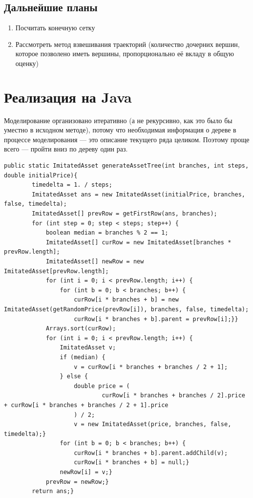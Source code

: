 \documentclass[specialist,
               substylefile = spbu.rtx,
               subf,href,colorlinks=true, 12pt]{disser}
\begin{document}
\section*{Дальнейшие планы}
	\begin{enumerate}
		\item Посчитать конечную сетку
		\item Рассмотреть метод взвешивания траекторий (количество дочерних вершин, которое позволено иметь вершины, пропорционально её вкладу в общую оценку)
	\end{enumerate}
\nocite{*}



\appendix
\chapter{Реализация на Java}
Моделирование организовано итеративно (а не рекурсивно, как это было бы уместно в исходном методе), потому что необходимая информация о дереве в процессе моделирования --- это описание текущего ряда целиком. Поэтому проще всего --- пройти вниз по дереву один раз.
\renewcommand{\lstlistingname}{Листинг}%
\renewcommand{\lstlistlistingname}{Листинги}
\begin{lstlisting}[caption={Генерирование дерева состояний актива, на который выписан опцион},label={lst:treeGeneration}]
public static ImitatedAsset generateAssetTree(int branches, int steps, double initialPrice){
        timedelta = 1. / steps;
        ImitatedAsset ans = new ImitatedAsset(initialPrice, branches, false, timedelta);
        ImitatedAsset[] prevRow = getFirstRow(ans, branches);
        for (int step = 0; step < steps; step++) {
            boolean median = branches % 2 == 1;
            ImitatedAsset[] curRow = new ImitatedAsset[branches * prevRow.length];
            ImitatedAsset[] newRow = new ImitatedAsset[prevRow.length];
            for (int i = 0; i < prevRow.length; i++) {
                for (int b = 0; b < branches; b++) {
                    curRow[i * branches + b] = new ImitatedAsset(getRandomPrice(prevRow[i]), branches, false, timedelta);
                    curRow[i * branches + b].parent = prevRow[i];}}
            Arrays.sort(curRow);
            for (int i = 0; i < prevRow.length; i++) {
                ImitatedAsset v;
                if (median) {
                    v = curRow[i * branches + branches / 2 + 1];
                } else {
                    double price = (
                            curRow[i * branches + branches / 2].price + curRow[i * branches + branches / 2 + 1].price
                    ) / 2;
                    v = new ImitatedAsset(price, branches, false, timedelta);}
                for (int b = 0; b < branches; b++) {
                    curRow[i * branches + b].parent.addChild(v);
                    curRow[i * branches + b] = null;}
                newRow[i] = v;}
            prevRow = newRow;}
        return ans;}
	\end{lstlisting}
\end{document}
